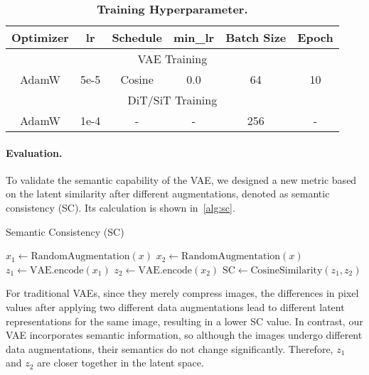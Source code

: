 \begin{table}[ht]
\vskip -0.15in
\centering
\setlength{\tabcolsep}{5pt}
\small %
\caption{\textbf{Training Hyperparameter.}}
\begin{tabular}{cccccc}
\toprule
Optimizer & lr   & Schedule & min\_lr & Batch Size & Epoch \\ \midrule
\multicolumn{6}{c}{VAE Training}                           \\ 
AdamW     & 5e-5 & Cosine      & 0.0     & 64         & 10    \\ \midrule
\multicolumn{6}{c}{DiT/SiT Training}                       \\ 
AdamW     & 1e-4 & -        & -       & 256        & -     \\ 
\bottomrule
\end{tabular}
\label{hyperpara}
\vskip -0.1in
\end{table}




\paragraph{Evaluation.} To validate the semantic capability of the VAE, we designed a new metric based on the latent similarity after different augmentations, denoted as semantic consistency (SC). Its calculation is shown in~\cref{alg:sc}.

\begin{algorithm}[h]
\caption{Semantic Consistency (SC)}
\label{alg:sc}
\begin{algorithmic}
\STATE $x_1 \gets \text{RandomAugmentation}(x)$
\STATE $x_2 \gets \text{RandomAugmentation}(x)$
\STATE $z_1 \gets \text{VAE.encode}(x_1)$
\STATE $z_2 \gets \text{VAE.encode}(x_2)$
\STATE $\text{SC} \gets \text{CosineSimilarity}(z_1, z_2)$
\end{algorithmic}
\end{algorithm}

For traditional VAEs, since they merely compress images, the differences in pixel values after applying two different data augmentations lead to different latent representations for the same image, resulting in a lower SC value. In contrast, our VAE incorporates semantic information, so although the images undergo different data augmentations, their semantics do not change significantly. Therefore, $z_1$ and $z_2$ are closer together in the latent space.

